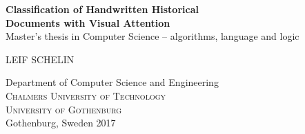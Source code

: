 
\begin{titlepage}
			
\addtolength{\voffset}{2cm}



\mbox{}
\vfill
\renewcommand{\familydefault}{\sfdefault} \normalfont %
\textbf{{\Huge 	
Classification of Handwritten Historical \\[0.2cm]
Documents with Visual Attention
				}} 	\\[0.5cm]
Master's thesis in Computer Science -- algorithms, language and logic \setlength{\parskip}{1cm}

{\Large LEIF SCHELIN} \setlength{\parskip}{2.9cm}

Department of Computer Science and Engineering \\
\textsc{Chalmers University of Technology} \\
\textsc{University of Gothenburg} \\
Gothenburg, Sweden 2017

\renewcommand{\familydefault}{\rmdefault} \normalfont %
\end{titlepage}


\newpage
\restoregeometry
\thispagestyle{empty}
\mbox{}


